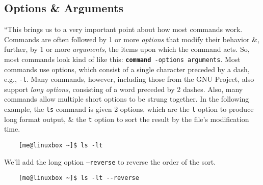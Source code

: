 \documentclass[oneside]{book}
\numberwithin{equation}{section}
\begin{document}
\subsection{Options \& Arguments}
``This brings us to a very important point about how most commands work. Commands are often followed by 1 or more \textit{options} that modify their behavior \&, further, by 1 or more \textit{arguments}, the items upon which the command acts. So, most commands look kind of like this: \texttt{\textbf{command} -options arguments}. Most commands use options, which consist of a single character preceded by a dash, e.g., \texttt{-l}. Many commands, however, including those from the GNU Project, also support \textit{long options}, consisting of a word preceded by 2 dashes. Also, many commands allow multiple short options to be strung together. In the following example, the \texttt{ls} command is given 2 options, which are the \texttt{l} option to produce long format output, \& the \texttt{t} option to sort the result by the file's modification time.
\begin{verbatim}
	[me@linuxbox ~]$ ls -lt
\end{verbatim}
We'll add the long option \texttt{--reverse} to reverse the order of the sort.
\begin{verbatim}
	[me@linuxbox ~]$ ls -lt --reverse
\end{verbatim}
\end{document}
